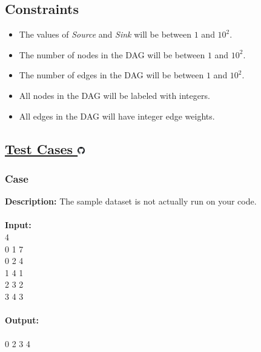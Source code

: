 \documentclass{article}
\newcommand{\code}[1]{{\fontfamily{pcr}\selectfont #1}}
\newcommand{\gitlogo}{\includegraphics[height=12.5]{c0/gitlogo.png}}
\begin{document}
\subsection*{Constraints}
\begin{itemize}
    \item The values of \emph{Source} and \emph{Sink} will be between $1$ and $10^2$.
    \item The number of nodes in the DAG will be between $1$ and $10^2$.
    \item The number of edges in the DAG will be between $1$ and $10^2$.
    \item All nodes in the DAG will be labeled with integers.
    \item All edges in the DAG will have integer edge weights.
\end{itemize}
\pagebreak

\subsection*{\href{https://github.com/rjeveloff/BA_problemregister/tree/main/test_cases/chapter_5/5D}{Test Cases \gitlogo}}
\subsubsection*{Case }
\hline \vspace{5}
\textbf{Description:} The sample dataset is not actually run on your code.\\ \\
\noindent \textbf{Input:}\\
\code{0 4\\0 1 7\\0 2 4\\1 4 1\\2 3 2\\3 4 3}\\ \\
\noindent \textbf{Output:}\\
\code{9\\0 2 3 4}
\end{document}
